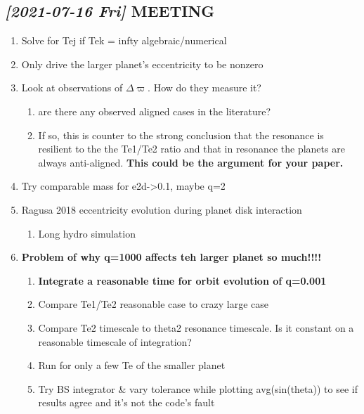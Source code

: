 \documentclass[11pt]{article}
\begin{document}
\subsection{\textit{[2021-07-16 Fri] } MEETING}
\label{sec:orgc3bd322}
\begin{enumerate}
\item Solve for Tej if Tek = infty algebraic/numerical
\item Only drive the larger planet's eccentricity to be nonzero
\item Look at observations of \(\Delta\varpi\). How do they measure it?
\begin{enumerate}
\item are there any observed aligned cases in the literature?
\item If so, this is counter to the strong conclusion that the
resonance is resilient to the the Te1/Te2 ratio and that in
resonance the planets are always anti-aligned. \textbf{This could be the
argument for your paper.}
\end{enumerate}
\item Try comparable mass for e2d->0.1, maybe q=2
\item Ragusa 2018 eccentricity evolution during planet disk interaction
\begin{enumerate}
\item Long hydro simulation
\end{enumerate}
\item \textbf{Problem of why q=1000 affects teh larger planet so much!!!!}
\begin{enumerate}
\item \textbf{Integrate a reasonable time for orbit evolution of q=0.001}
\item Compare Te1/Te2 reasonable case to crazy large case
\item Compare Te2 timescale to theta2 resonance timescale. Is it
constant on a reasonable timescale of integration?
\item Run for only a few Te of the smaller planet
\item Try BS integrator \& vary tolerance while plotting
avg(sin(theta)) to see if results agree and it's not the code's
fault
\end{enumerate}
\end{enumerate}
\end{document}
